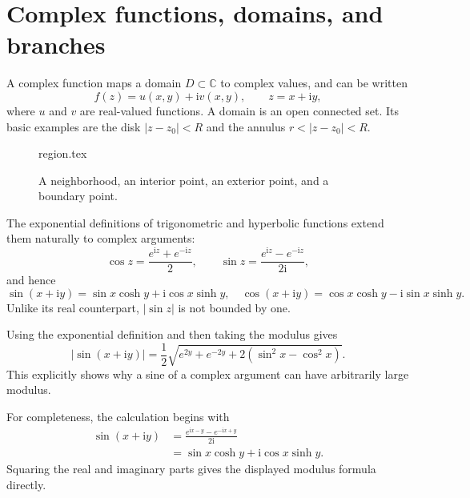 \section{Complex functions, domains, and branches}

A complex function maps a domain $D\subset\mathbb{C}$ to complex values, and can be written
\begin{equation}
f(z)=u(x,y)+\mathrm{i}v(x,y),\qquad z=x+\mathrm{i}y,
\end{equation}
where $u$ and $v$ are real-valued functions. A domain is an open connected set. Its basic examples are the disk $|z-z_0|<R$ and the annulus $r<|z-z_0|<R$.

\begin{figure}[htb]
    \centering
    {region.tex}
    \caption{A neighborhood, an interior point, an exterior point, and a boundary point.}
    \label{fig:ch06-domain}
\end{figure}

The exponential definitions of trigonometric and hyperbolic functions extend them naturally to complex arguments:
\begin{equation}
\cos z=\frac{e^{\mathrm{i}z}+e^{-\mathrm{i}z}}{2},\qquad
\sin z=\frac{e^{\mathrm{i}z}-e^{-\mathrm{i}z}}{2\mathrm{i}},
\end{equation}
and hence
\begin{equation}
\sin(x+\mathrm{i}y)=\sin x\cosh y+\mathrm{i}\cos x\sinh y,
\quad
\cos(x+\mathrm{i}y)=\cos x\cosh y-\mathrm{i}\sin x\sinh y.
\end{equation}
Unlike its real counterpart, $|\sin z|$ is not bounded by one.

\begin{example}
Using the exponential definition and then taking the modulus gives
\begin{equation}
|\sin(x+\mathrm{i}y)|
=\frac12\sqrt{e^{2y}+e^{-2y}+2(\sin^2x-\cos^2x)}.
\end{equation}
This explicitly shows why a sine of a complex argument can have arbitrarily large modulus.
\end{example}

For completeness, the calculation begins with
\begin{align}
\sin(x+\mathrm{i}y)
&=\frac{e^{\mathrm{i}x-y}-e^{-\mathrm{i}x+y}}{2\mathrm{i}}\nonumber\\
&=\sin x\cosh y+\mathrm{i}\cos x\sinh y.
\end{align}
Squaring the real and imaginary parts gives the displayed modulus formula directly.


